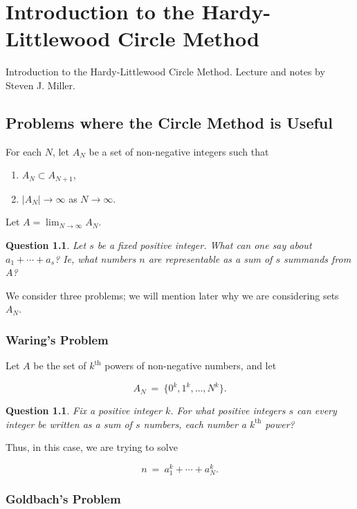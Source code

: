 \documentclass[12pt,letterpaper]{report}
\newcommand\be{\begin{equation}}
\newcommand\ee{\end{equation}}
\newcommand\ben{\begin{enumerate}}
\newcommand\een{\end{enumerate}}
\newtheorem{que}[thm]{Question}
\begin{document}

\chapter{Introduction to the Hardy-Littlewood Circle Method}

Introduction to the Hardy-Littlewood Circle Method. Lecture and
notes by Steven J. Miller.

\section{Problems where the Circle Method is Useful}

For each $N$, let $A_N$ be a set of non-negative integers such
that

\ben
\item $A_N \subset A_{N+1}$,
\item $|A_N| \to \infty$ as $N \to \infty$.
\een

Let $A = \lim_{N \to \infty} A_N$.

\begin{que} Let $s$ be a fixed positive integer. What can one say
about $a_1 + \cdots + a_s$? Ie, what numbers $n$ are representable
as a sum of $s$ summands from $A$? \end{que}

We consider three problems; we will mention later why we are
considering sets $A_N$.

\subsection{Waring's Problem}

Let $A$ be the set of $k^{\text{th}}$ powers of non-negative
numbers, and let

\be A_N \ = \ \{0^k, 1^k, \dots, N^k\}. \ee

\begin{que} Fix a positive integer $k$. For what positive integers
$s$ can every integer be written as a sum of $s$ numbers, each
number a $k^{\text{th}}$ power? \end{que}

Thus, in this case, we are trying to solve

\be n \ = \ a_1^k + \cdots + a_N^k. \ee

\subsection{Goldbach's Problem}
\end{document}
